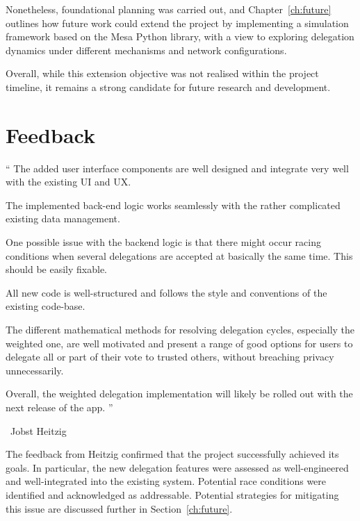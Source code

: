 Nonetheless, foundational planning was carried out, and Chapter~\ref{ch:future} outlines how future work could extend the project by implementing a simulation framework based on the Mesa Python library, with a view to exploring delegation dynamics under different mechanisms and network configurations.

Overall, while this extension objective was not realised within the project timeline, it remains a strong candidate for future research and development.


\section{Feedback}
\label{sec:feedback}

\begin{displayquote}
    \textquotedblleft{}
    The added user interface components are well designed and integrate very well with the existing UI and UX.
    
    The implemented back-end logic works seamlessly with the rather complicated existing data management.
    
    One possible issue with the backend logic is that there might occur racing conditions when several delegations are accepted at basically the same time. This should be easily fixable.
    
    All new code is well-structured and follows the style and conventions of the existing code-base.
    
    The different mathematical methods for resolving delegation cycles, especially the weighted one, are well motivated and present a range of good options for users to delegate all or part of their vote to trusted others, without breaching privacy unnecessarily.
    
    Overall, the weighted delegation implementation will likely be rolled out with the next release of the app.
    \textquotedblright{}
    \end{displayquote}
    
\begin{flushright}
\textemdash\ Jobst Heitzig
\end{flushright}
    

The feedback from Heitzig confirmed that the project successfully achieved its goals. In particular, the new delegation features were assessed as well-engineered and well-integrated into the existing system. Potential race conditions were identified and acknowledged as addressable. Potential strategies for mitigating this issue are discussed further in Section~\ref{ch:future}.

